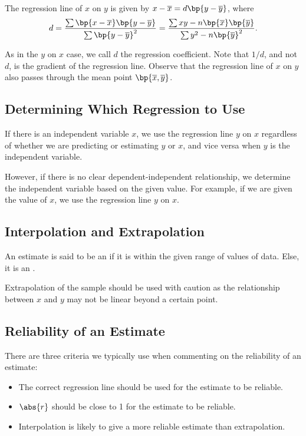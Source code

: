 \begin{proposition}
    The regression line of $x$ on $y$ is given by $x - \ol{x} = d\bp{y - \ol{y}}$, where \[d = \frac{\sum \bp{x - \ol{x}} \bp{y - \ol{y}}}{\sum \bp{y - \ol{y}}^2} = \frac{\sum xy - n \bp{\ol{x}}\bp{\ol{y}}}{\sum y^2 - n \bp{\ol{y}}^2}.\]
\end{proposition}

As in the $y$ on $x$ case, we call $d$ the regression coefficient. Note that $1/d$, and not $d$, is the gradient of the regression line. Observe that the regression line of $x$ on $y$ also passes through the mean point $\bp{\ol{x}, \ol{y}}$.

\subsection{Determining Which Regression to Use}

If there is an independent variable $x$, we use the regression line $y$ on $x$ regardless of whether we are predicting or estimating $y$ or $x$, and vice versa when $y$ is the independent variable.

However, if there is no clear dependent-independent relationship, we determine the independent variable based on the given value. For example, if we are given the value of $x$, we use the regression line $y$ on $x$.

\subsection{Interpolation and Extrapolation}

\begin{definition}
    An estimate is said to be an  if it is within the given range of values of data. Else, it is an .
\end{definition}

Extrapolation of the sample should be used with caution as the relationship between $x$ and $y$ may not be linear beyond a certain point.

\subsection{Reliability of an Estimate}

There are three criteria we typically use when commenting on the reliability of an estimate:
\begin{itemize}
    \item {} The correct regression line should be used for the estimate to be reliable.
    \item {} $\abs{r}$ should be close to 1 for the estimate to be reliable.
    \item {} Interpolation is likely to give a more reliable estimate than extrapolation.
\end{itemize}

